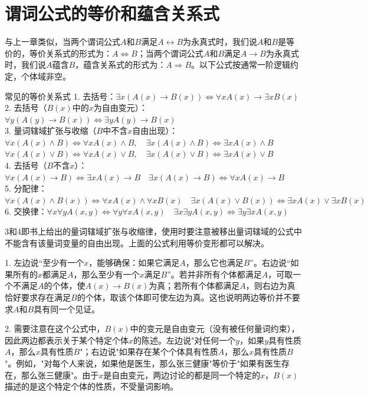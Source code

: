 \documentclass[lang=cn,11pt]{elegantbook}
\begin{document}
\section{谓词公式的等价和蕴含关系式}
与上一章类似，当两个谓词公式$A$和$B$满足$A\leftrightarrow B$为永真式时，我们说$A$和$B$是等价的，等价关系式的形式为：$A\Leftrightarrow B$；当两个谓词公式$A$和$B$满足$A\rightarrow B$为永真式时，我们说$A$蕴含$B$，蕴含关系式的形式为：$A\Rightarrow B$。以下公式按通常一阶逻辑约定，个体域非空。
\begin{theorem}{常见的等价关系式}
1. 去括号：$\exists x(A(x)\to B(x))\Leftrightarrow \forall xA(x)\to \exists xB(x)$\\
2. 去括号（$B(x)$中的$x$为自由变元）：$\forall y(A(y)\to B(x))\Leftrightarrow \exists yA(y)\to B(x)$\\
3. 量词辖域扩张与收缩（$B$中不含$x$自由出现）：\\
$\forall x(A(x)\land B)\Leftrightarrow \forall xA(x)\land B,\quad \exists x(A(x)\land B)\Leftrightarrow \exists xA(x)\land B$\\
$\forall x(A(x)\lor B)\Leftrightarrow \forall xA(x)\lor B,\quad \exists x(A(x)\lor B)\Leftrightarrow \exists xA(x)\lor B$\\
4. 去括号（$B$不含$x$）：$\forall x(A(x)\to B)\Leftrightarrow \exists xA(x)\to B\quad  \exists x(A(x)\to B)\Leftrightarrow \forall xA(x)\to B$\\
5. 分配律：$\forall x(A(x)\land B(x))\Leftrightarrow \forall xA(x)\land \forall xB(x)\quad \exists x(A(x)\lor B(x))\Leftrightarrow \exists xA(x)\lor \exists xB(x)$\\
6. 交换律：$\forall x\forall y A(x,y)\Leftrightarrow \forall y\forall x A(x,y)\quad \exists x\exists y A(x,y)\Leftrightarrow \exists y\exists x A(x,y)$
\end{theorem}
3和4即书上给出的量词辖域扩张与收缩律，使用时要注意被移出量词辖域的公式中不能含有该量词变量的自由出现。上面的公式利用等价变形都可以解决。

1. 左边说“至少有一个$x$，能够确保：如果它满足$A$，那么它也满足$B$”。右边说“如果所有的$x$都满足$A$，那么至少有一个$x$满足$B$”。若并非所有个体都满足$A$，可取一个不满足$A$的个体，使$A(x)\to B(x)$为真；若所有个体都满足$A$，则右边为真恰好要求存在满足$B$的个体，取该个体即可使左边为真。这也说明两边等价并不要求$A$和$B$具有同一个见证。

2. 需要注意在这个公式中，$B(x)$中的变元是自由变元（没有被任何量词约束），因此两边都表示关于某个特定个体$x$的陈述。左边说"对任何一个$y$，如果$y$具有性质$A$，那么$x$具有性质$B$"；右边说"如果存在某个个体具有性质$A$，那么$x$具有性质$B$"。例如，"对每个人来说，如果他是医生，那么张三健康"等价于"如果有医生存在，那么张三健康"。由于$x$是自由变元，两边讨论的都是同一个特定的$x$，$B(x)$描述的是这个特定个体的性质，不受量词影响。
\end{document}
